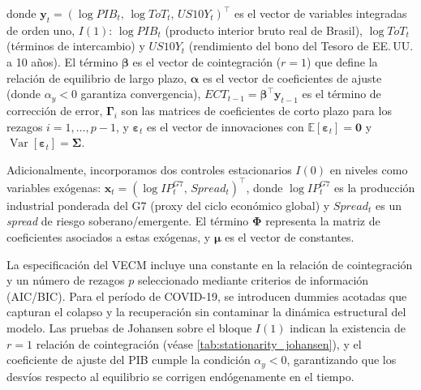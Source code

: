 \documentclass[11pt,a4paper]{article}
\numberwithin{equation}{section}
\newcommand{\vect}[1]{\boldsymbol{#1}}
\DeclareMathOperator{\Var}{Var}
\begin{document}
\noindent donde $\vect{y}_t = (\log PIB_t,\, \log ToT_t,\, US10Y_t)^{\top}$ es el vector de variables integradas de orden uno, $I(1)$: $\log PIB_t$ (producto interior bruto real de Brasil), $\log ToT_t$ (términos de intercambio) y $US10Y_t$ (rendimiento del bono del Tesoro de EE.\,UU. a 10 años). El término $\vect{\beta}$ es el vector de cointegración ($r=1$) que define la relación de equilibrio de largo plazo, $\vect{\alpha}$ es el vector de coeficientes de ajuste (donde $\alpha_y < 0$ garantiza convergencia), $ECT_{t-1} = \vect{\beta}^{\top}\vect{y}_{t-1}$ es el término de corrección de error, $\vect{\Gamma}_i$ son las matrices de coeficientes de corto plazo para los rezagos $i=1,\ldots,p-1$, y $\vect{\varepsilon}_t$ es el vector de innovaciones con $\mathbb{E}[\vect{\varepsilon}_t]=\vect{0}$ y $\Var[\vect{\varepsilon}_t]=\vect{\Sigma}$.

Adicionalmente, incorporamos dos controles estacionarios $I(0)$ en niveles como variables exógenas: $\vect{x}_t = (\log IP^{G7}_t,\, Spread_t)^{\top}$, donde $\log IP^{G7}_t$ es la producción industrial ponderada del G7 (proxy del ciclo económico global) y $Spread_t$ es un \emph{spread} de riesgo soberano/emergente. El término $\vect{\Phi}$ representa la matriz de coeficientes asociados a estas exógenas, y $\vect{\mu}$ es el vector de constantes.

La especificación del VECM incluye una constante en la relación de cointegración y un número de rezagos $p$ seleccionado mediante criterios de información (AIC/BIC). Para el período de COVID-19, se introducen dummies acotadas que capturan el colapso y la recuperación sin contaminar la dinámica estructural del modelo. Las pruebas de Johansen sobre el bloque $I(1)$ indican la existencia de $r=1$ relación de cointegración (véase \cref{tab:stationarity_johansen}), y el coeficiente de ajuste del PIB cumple la condición $\alpha_y<0$, garantizando que los desvíos respecto al equilibrio se corrigen endógenamente en el tiempo.
\end{document}
